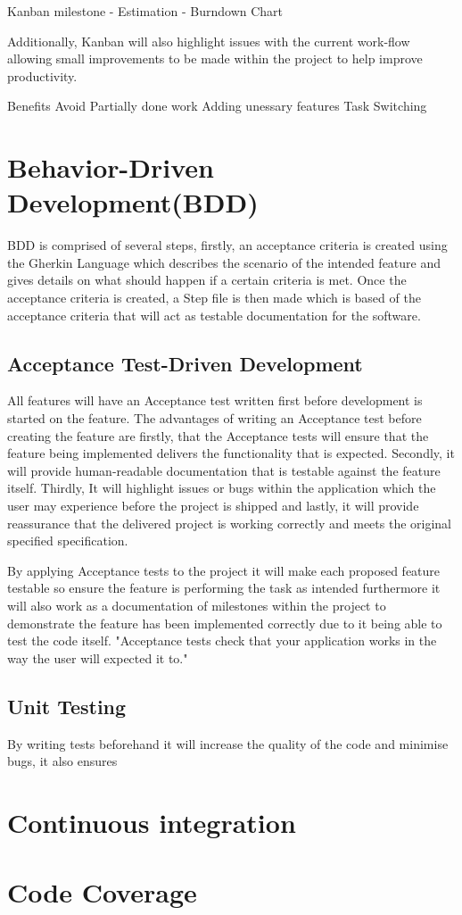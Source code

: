 Kanban milestone - Estimation - Burndown Chart

Additionally, Kanban will also highlight issues with the current work-flow allowing small improvements to be made within the project to help improve productivity.

Benefits
Avoid Partially done work
Adding unessary features
Task Switching


\section{Behavior-Driven Development(BDD)}
BDD is comprised of several steps, firstly, an acceptance criteria is created using the Gherkin Language which describes the scenario of the intended feature and gives details on what should happen if a certain criteria is met. 
Once the acceptance criteria is created, a Step file is then made which is based of the acceptance criteria that will act as testable documentation for the software.

\subsection{Acceptance Test-Driven Development}
All features will have an Acceptance test written first before development is started on the feature. The advantages of writing an Acceptance test before creating the feature are firstly, that the Acceptance tests will ensure that the feature being implemented delivers the functionality that is expected. Secondly, it will provide human-readable documentation that is testable against the feature itself. Thirdly, It will highlight issues or bugs within the application which the user may experience before the project is shipped and lastly, it will provide reassurance that the delivered project is working correctly and meets the original specified specification.

By applying Acceptance tests to the project it will make each proposed feature testable so ensure the feature is performing the task as intended furthermore it will also work as a documentation of milestones within the project to demonstrate the feature has been implemented correctly due to it being able to test the code itself. "Acceptance tests check that your application works in the way the user will expected it to."\cite{sale2014testingpython}

\subsection{Unit Testing}
By writing tests beforehand it will increase the quality of the code and minimise bugs, it also ensures 
\section{Continuous integration}
\section{Code Coverage}